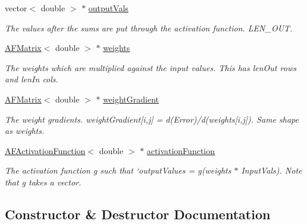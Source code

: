 \begin{DoxyCompactItemize}
\mbox{\label{classLayer_a42731a44d761c086b0c4914fcc2ba8a0}} 
vector$<$ double $>$ $\ast$ \hyperlink{classLayer_a42731a44d761c086b0c4914fcc2ba8a0}{output\+Vals}
\begin{DoxyCompactList}\small\item\em The values after the sums are put through the activation function. L\+E\+N\+\_\+\+O\+UT. \end{DoxyCompactList}\item 
\mbox{\label{classLayer_acb311104d54fd7c09ea4c07006f8fc45}} 
\hyperlink{classAFMatrix}{A\+F\+Matrix}$<$ double $>$ $\ast$ \hyperlink{classLayer_acb311104d54fd7c09ea4c07006f8fc45}{weights}
\begin{DoxyCompactList}\small\item\em The weights which are multiplied against the input values. This has {\ttfamily len\+Out} rows and {\ttfamily len\+In} cols. \end{DoxyCompactList}\item 
\mbox{\label{classLayer_a8b36a2bc8a623ab02c0545097ebc967f}} 
\hyperlink{classAFMatrix}{A\+F\+Matrix}$<$ double $>$ $\ast$ \hyperlink{classLayer_a8b36a2bc8a623ab02c0545097ebc967f}{weight\+Gradient}
\begin{DoxyCompactList}\small\item\em The weight gradients. {\ttfamily weight\+Gradient\mbox{[}i,j\mbox{]} = d(\+Error)/d(weights\mbox{[}i,j\mbox{]})}. Same shape as {\ttfamily weights}. \end{DoxyCompactList}\item 
\mbox{\label{classLayer_abe40a67ce33b17440ff6b0571b0c49e5}} 
\hyperlink{classAFActivationFunction}{A\+F\+Activation\+Function}$<$ double $>$ $\ast$ \hyperlink{classLayer_abe40a67ce33b17440ff6b0571b0c49e5}{activation\+Function}
\begin{DoxyCompactList}\small\item\em The activation function {\ttfamily g} such that `output\+Values = g(weights $\ast$ Input\+Vals). Note that g takes a vector. \end{DoxyCompactList}\end{DoxyCompactItemize}


\subsection{Constructor \& Destructor Documentation}
\mbox{\label{classLayer_ac7b74e6fa9a90f78753c0318cf731719}} 
